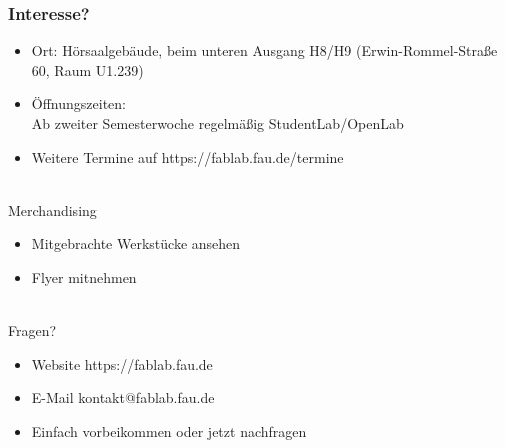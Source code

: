 \documentclass[t]{beamer}
\begin{document}
\begin{frame}
	\frametitle{Interesse?}
	
	\begin{itemize}
		\item Ort: Hörsaalgebäude, beim unteren Ausgang H8/H9 (Erwin-Rommel-Straße 60, Raum U1.239)
		\item Öffnungszeiten: \\Ab zweiter Semesterwoche regelmäßig StudentLab/OpenLab
		\item Weitere Termine auf {\color{blue} https://fablab.fau.de/termine}
	\end{itemize}
	~\\
	Merchandising
	\begin{itemize}
		\item Mitgebrachte Werkstücke ansehen
		\item Flyer mitnehmen
	\end{itemize}
	~\\
	Fragen?
	\begin{itemize}
		\item Website {\color{blue} https://fablab.fau.de}
		\item E-Mail {\color{blue} kontakt@fablab.fau.de}
		\item Einfach vorbeikommen oder jetzt nachfragen
	\end{itemize}
\end{frame}

% 

\end{document}
